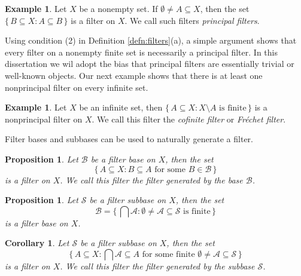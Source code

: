 \documentclass[12pt]{article}
\theoremstyle{plain}
\newtheorem{prop}[thm]{Proposition}
\newtheorem{cor}[thm]{Corollary}
\theoremstyle{definition}
\newtheorem{example}[thm]{Example}
\newcommand{\calA}{\mathcal{A}}
\newcommand{\calB}{\mathcal{B}}
\newcommand{\calS}{\mathcal{S}}
\begin{document}
\begin{example}
  \label{ex:prinFilt}
  Let $X$ be a nonempty set.
  If $\emptyset \ne A \subseteq X$, then the set $\{\, B \subseteq X : A \subseteq B \,\}$ is a filter on $X$.
  We call such filters \textsl{principal filters}.
\end{example}

Using condition (2) in Definition \ref{defn:filters}(a), a simple argument shows that every filter on a nonempty finite set is necessarily a principal filter.
In this dissertation we wil adopt the bias that principal filters are essentially trivial or well-known objects.
Our next example shows that there is at least one nonprincipal filter on every infinite set.

\begin{example}
  Let $X$ be an infinite set, then $\{\, A \subseteq X : \mbox{$X \setminus A$ is finite} \,\}$ is a nonprincipal filter on $X$.
  We call this filter the \textsl{cofinite filter} or \textsl{Fr\'{e}chet filter}.
\end{example}

Filter bases and subbases can be used to naturally generate a filter.

\begin{prop}
  \label{prop:fltBase}
  Let $\calB$ be a filter base on $X$, then the set
  \[
    \{\, A \subseteq X : \mbox{$B \subseteq A$ for some $B \in \calB$} \,\}
  \]
  is a filter on $X$.
  We call this filter the \textsl{filter generated by the base $\calB$}.
\end{prop}

\begin{prop}
  Let $\calS$ be a filter subbase on $X$, then the set
  \[
     \calB = \bigl\{\, \bigcap \calA : \mbox{$\emptyset \ne \calA \subseteq \calS$ is finite} \,\bigr\}
  \]
  is a filter base on $X$. 
\end{prop}
\begin{cor}
  \label{cor:fltSubbase}
  Let $\calS$ be a filter subbase on $X$, then the set
  \[
    \{\, A \subseteq X : \mbox{$\bigcap\calA \subseteq A$ for some finite $\emptyset \ne \calA \subseteq \calS$} \,\}
  \]
  is a filter on $X$.
  We call this filter the \textsl{filter generated by the subbase $\calS$}.
\end{cor}

\end{document}
